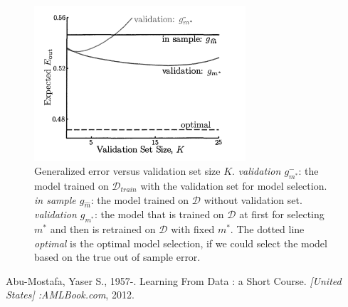 \documentclass[10pt]{article}
\begin{document}
\begin{figure}[h]
    \centering
    \includegraphics[width=0.7\textwidth]{figure/GeneralizedErrorVsValidationSize.png}
    \caption{Generalized error versus validation set size $K$. \emph{validation $g_{{m}^*}^-$}: the model trained on $\mathcal{D}_{train}$ with the validation set for model selection. \emph{in sample $g_{\hat{m}}$}: the model trained on $\mathcal{D}$ without validation set. \emph{validation $g_{{m}^*}$}: the model that is trained on $\mathcal{D}$ at first for selecting $m^*$ and then is retrained on $\mathcal{D}$ with fixed $m^*$.  
    The dotted line \emph{optimal} is the optimal model selection, if we could select the model based on the true out of sample error.
    }
    \label{fig:problem6fig}
\end{figure}

\begin{thebibliography}{9}
Abu-Mostafa, Yaser S., 1957-. Learning From Data : a Short Course. \emph{[United States] :AMLBook.com}, 2012.


\end{thebibliography}
\end{document}
